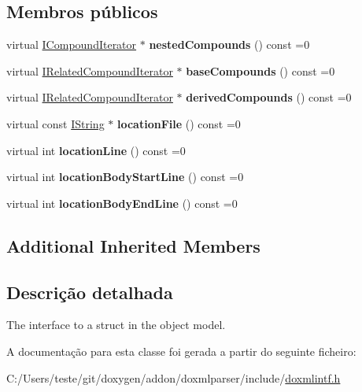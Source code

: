 \subsection*{Membros públicos}
\begin{DoxyCompactItemize}
\item 
\hypertarget{class_i_struct_a6a1aab20f15a204af0b8d3e8470817bd}{virtual \hyperlink{class_i_compound_iterator}{I\-Compound\-Iterator} $\ast$ {\bfseries nested\-Compounds} () const =0}\label{class_i_struct_a6a1aab20f15a204af0b8d3e8470817bd}

\item 
\hypertarget{class_i_struct_a226f8a714bede3ebbac649e35dee67f1}{virtual \hyperlink{class_i_related_compound_iterator}{I\-Related\-Compound\-Iterator} $\ast$ {\bfseries base\-Compounds} () const =0}\label{class_i_struct_a226f8a714bede3ebbac649e35dee67f1}

\item 
\hypertarget{class_i_struct_a90c089115e36f8a84f78d172a249a4fd}{virtual \hyperlink{class_i_related_compound_iterator}{I\-Related\-Compound\-Iterator} $\ast$ {\bfseries derived\-Compounds} () const =0}\label{class_i_struct_a90c089115e36f8a84f78d172a249a4fd}

\item 
\hypertarget{class_i_struct_a379530604a2eb817e4d46a9f70cd08cb}{virtual const \hyperlink{class_i_string}{I\-String} $\ast$ {\bfseries location\-File} () const =0}\label{class_i_struct_a379530604a2eb817e4d46a9f70cd08cb}

\item 
\hypertarget{class_i_struct_a47cd57dc825961bb4dad2ef542bd036c}{virtual int {\bfseries location\-Line} () const =0}\label{class_i_struct_a47cd57dc825961bb4dad2ef542bd036c}

\item 
\hypertarget{class_i_struct_a343f2223ac6f03570d47586987504b63}{virtual int {\bfseries location\-Body\-Start\-Line} () const =0}\label{class_i_struct_a343f2223ac6f03570d47586987504b63}

\item 
\hypertarget{class_i_struct_a0a92a291dc5cf7af0d319b65ff4b4811}{virtual int {\bfseries location\-Body\-End\-Line} () const =0}\label{class_i_struct_a0a92a291dc5cf7af0d319b65ff4b4811}

\end{DoxyCompactItemize}
\subsection*{Additional Inherited Members}


\subsection{Descrição detalhada}
The interface to a struct in the object model. 

A documentação para esta classe foi gerada a partir do seguinte ficheiro\-:\begin{DoxyCompactItemize}
\item 
C\-:/\-Users/teste/git/doxygen/addon/doxmlparser/include/\hyperlink{include_2doxmlintf_8h}{doxmlintf.\-h}\end{DoxyCompactItemize}
